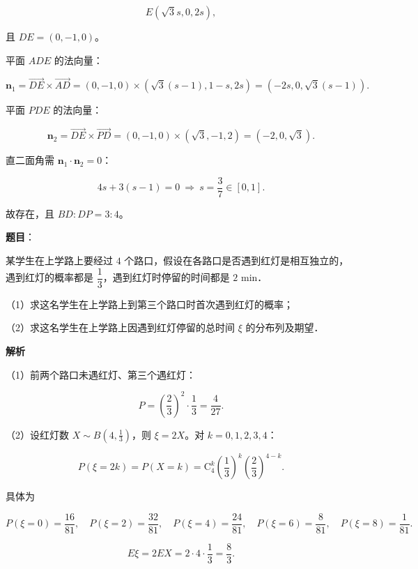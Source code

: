 \begin{answer}
\nopagebreak[4]
\[E(\sqrt3s,0,2s),\]

且 $DE=(0,-1,0)$。

平面 $ADE$ 的法向量：

\nopagebreak[4]
\[\mathbf n_1=\overrightarrow{DE}\times\overrightarrow{AD}
=(0,-1,0)\times(\sqrt3(s-1),1-s,2s)
=(-2s,0,\sqrt3(s-1)).\]

平面 $PDE$ 的法向量：

\nopagebreak[4]
\[\mathbf n_2=\overrightarrow{DE}\times\overrightarrow{PD}
=(0,-1,0)\times(\sqrt3,-1,2)=(-2,0,\sqrt3).\]

直二面角需 $\mathbf n_1\cdot\mathbf n_2=0$：

\nopagebreak[4]
\[4s+3(s-1)=0\ \Longrightarrow\ s=\frac37\in[0,1].\]

故存在，且 $BD:DP=3:4$。


\end{answer}
\begin{answer}

\textbf{题目}：

某学生在上学路上要经过 $4$ 个路口，假设在各路口是否遇到红灯是相互独立的，遇到红灯的概率都是 $\dfrac13$，遇到红灯时停留的时间都是 $2$ min．

（1）求这名学生在上学路上到第三个路口时首次遇到红灯的概率；

（2）求这名学生在上学路上因遇到红灯停留的总时间 $\xi$ 的分布列及期望．

\textbf{解析}

（1）前两个路口未遇红灯、第三个遇红灯：

\nopagebreak[4]
\[P=\left(\frac23\right)^2\cdot\frac13=\frac4{27}.\]

（2）设红灯数 $X\sim B\left(4,\frac13\right)$，则 $\xi=2X$。对 $k=0,1,2,3,4$：

\nopagebreak[4]
\[P(\xi=2k)=P(X=k)=\mathrm C_4^k\left(\frac13\right)^k\left(\frac23\right)^{4-k}.\]

具体为

\nopagebreak[4]
\[P(\xi=0)=\frac{16}{81},\quad P(\xi=2)=\frac{32}{81},\quad
P(\xi=4)=\frac{24}{81},\quad P(\xi=6)=\frac{8}{81},\quad P(\xi=8)=\frac1{81}.\]

\nopagebreak[4]
\[E\xi=2EX=2\cdot4\cdot\frac13=\frac83 .\]


\end{answer}

